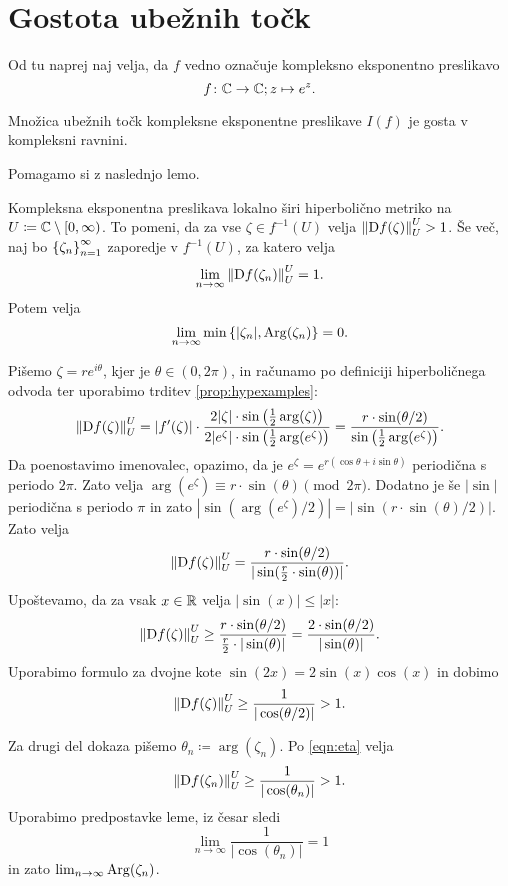 \section{Gostota ubežnih točk}

Od tu naprej naj velja, da \(f\) vedno označuje kompleksno eksponentno preslikavo
\[f \colon \mathbb C \to \mathbb C; z \mapsto e^{z}.\]

\begin{izrek} \label{thm:escapingdense}
    Množica ubežnih točk kompleksne eksponentne preslikave \(I (f)\) je gosta v kompleksni ravnini.
\end{izrek}

\noindent Pomagamo si z naslednjo lemo.

\begin{lema} \label{lem:hyper}
    Kompleksna eksponentna preslikava lokalno širi hiperbolično metriko na \(U \coloneq \mathbb C \setminus [0, \infty)\). To pomeni, da za vse \(\zeta \in f^{-1} (U)\) velja \(\left\| \mathrm{D} f (\zeta) \right\|_{U}^{U} > 1\). Še več, naj bo \(\left\{ \zeta_n \right\}_{n = 1}^{\infty}\) zaporedje v \(f^{-1} (U)\), za katero velja \[\lim_{n \to \infty} \left\| \mathrm{D} f (\zeta_n) \right\|_{U}^{U} = 1.\] Potem velja
    \[\lim_{n \to \infty} \min \left\{ |\zeta_n|, \operatorname{Arg} (\zeta_n) \right\} = 0.\]
\end{lema}

\begin{dokaz}
    Pišemo \(\zeta = r e^{i \theta}\), kjer je \(\theta \in (0, 2 \pi)\), in računamo po definiciji hiperboličnega odvoda ter uporabimo trditev \ref{prop:hypexamples}:
    \[
        \left\| \mathrm{D} f (\zeta) \right\|_{U}^{U}
        =
        |f' (\zeta)| \cdot \frac{2 |\zeta| \cdot \sin \left( \frac{1}{2} \arg (\zeta) \right)}{2 |e^{\zeta}| \cdot \sin \left( \frac{1}{2} \arg (e^{\zeta}) \right)}
        =
        \frac{r \cdot \sin (\theta / 2)}{\sin \left( \frac{1}{2} \arg (e^{\zeta}) \right)}.    
    \]
    Da poenostavimo imenovalec, opazimo, da je \(e^{\zeta} = e^{r (\cos \theta + i \sin \theta)}\) periodična s periodo \(2 \pi\). Zato velja \(\arg (e^{\zeta}) \equiv r \cdot \sin (\theta) \pmod{2 \pi}\). Dodatno je še \(|\sin|\) periodična s periodo \(\pi\) in zato \(|\sin (\arg (e^{\zeta}) / 2)| = |\sin (r \cdot \sin (\theta) / 2)|\). Zato velja
    \[\left\| \mathrm{D} f (\zeta) \right\|_{U}^{U} = \frac{r \cdot \sin (\theta / 2)}{|\sin (\frac{r}{2} \cdot \sin (\theta))|}.\]
    Upoštevamo, da za vsak \(x \in \mathbb R\) velja \(|\sin (x)| \leq |x|\):
    \[\left\| \mathrm{D} f (\zeta) \right\|_{U}^{U} \geq \frac{r \cdot \sin (\theta / 2)}{\frac{r}{2} \cdot |\sin (\theta)|} = \frac{2 \cdot \sin (\theta / 2)}{|\sin (\theta)|}.\]
    Uporabimo formulo za dvojne kote \(\sin (2 x) = 2 \sin (x) \cos (x)\) in dobimo
    \begin{equation} \label{eqn:eta}
        \left\| \mathrm{D} f (\zeta) \right\|_{U}^{U} \geq \frac{1}{|\cos (\theta / 2)|} > 1.
    \end{equation}

    \noindent Za drugi del dokaza pišemo \(\theta_n \coloneq \arg (\zeta_n)\). Po \eqref{eqn:eta} velja
    \[\left\| \mathrm{D} f (\zeta_n) \right\|_{U}^{U} \geq \frac{1}{|\cos (\theta_n)|} > 1.\]
    Uporabimo predpostavke leme, iz česar sledi
    \[\lim_{n \to \infty} \frac{1}{|\cos (\theta_n)|} = 1\]
    in zato \(\lim_{n \to \infty} \operatorname{Arg} (\zeta_n)\).
\end{dokaz}

